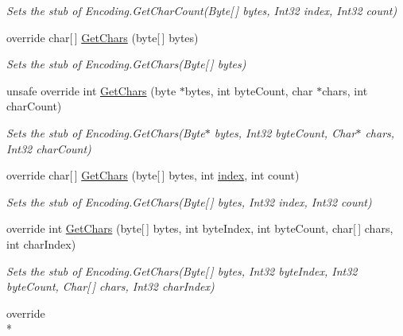 \begin{DoxyCompactItemize}
\begin{DoxyCompactList}\small\item\em Sets the stub of Encoding.\-Get\-Char\-Count(\-Byte\mbox{[}$\,$\mbox{]} bytes, Int32 index, Int32 count)\end{DoxyCompactList}\item 
override char\mbox{[}$\,$\mbox{]} \hyperlink{class_system_1_1_text_1_1_fakes_1_1_stub_encoding_aa2b5afca67fa34ad7d39264789bd8f4b}{Get\-Chars} (byte\mbox{[}$\,$\mbox{]} bytes)
\begin{DoxyCompactList}\small\item\em Sets the stub of Encoding.\-Get\-Chars(\-Byte\mbox{[}$\,$\mbox{]} bytes)\end{DoxyCompactList}\item 
unsafe override int \hyperlink{class_system_1_1_text_1_1_fakes_1_1_stub_encoding_a0b506c4b582e336c3d7c7fae1e5b7027}{Get\-Chars} (byte $\ast$bytes, int byte\-Count, char $\ast$chars, int char\-Count)
\begin{DoxyCompactList}\small\item\em Sets the stub of Encoding.\-Get\-Chars(\-Byte$\ast$ bytes, Int32 byte\-Count, Char$\ast$ chars, Int32 char\-Count)\end{DoxyCompactList}\item 
override char\mbox{[}$\,$\mbox{]} \hyperlink{class_system_1_1_text_1_1_fakes_1_1_stub_encoding_ab671929b2aa05d8f9c055c5b9eccb6de}{Get\-Chars} (byte\mbox{[}$\,$\mbox{]} bytes, int \hyperlink{jquery-1_810_82-vsdoc_8js_a75bb12d1f23302a9eea93a6d89d0193e}{index}, int count)
\begin{DoxyCompactList}\small\item\em Sets the stub of Encoding.\-Get\-Chars(\-Byte\mbox{[}$\,$\mbox{]} bytes, Int32 index, Int32 count)\end{DoxyCompactList}\item 
override int \hyperlink{class_system_1_1_text_1_1_fakes_1_1_stub_encoding_a10d147b3f9f6bc636c64f2a08598f46e}{Get\-Chars} (byte\mbox{[}$\,$\mbox{]} bytes, int byte\-Index, int byte\-Count, char\mbox{[}$\,$\mbox{]} chars, int char\-Index)
\begin{DoxyCompactList}\small\item\em Sets the stub of Encoding.\-Get\-Chars(\-Byte\mbox{[}$\,$\mbox{]} bytes, Int32 byte\-Index, Int32 byte\-Count, Char\mbox{[}$\,$\mbox{]} chars, Int32 char\-Index)\end{DoxyCompactList}\item 
override \\*

\end{DoxyCompactItemize}
